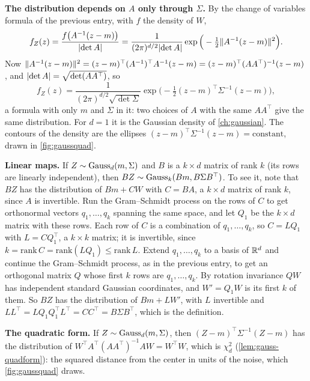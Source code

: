 \textbf{The distribution depends on $A$ only through $\Sigma$.}
By the change of variables formula of the previous entry, with $f$ the density of $W$,
\[
f_Z(z) = \frac{f\big(A^{-1}(z - m)\big)}{\lvert\det A\rvert} = \frac{1}{(2\pi)^{d/2}\lvert\det A\rvert}\exp\Big(-\tfrac12\lVert A^{-1}(z - m)\rVert^2\Big).
\]
Now $\lVert A^{-1}(z - m)\rVert^2 = (z - m)^\top(A^{-1})^\top A^{-1}(z - m) = (z - m)^\top(AA^\top)^{-1}(z - m)$, and $\lvert\det A\rvert = \sqrt{\det(AA^\top)}$, so
\[
f_Z(z) = \frac{1}{(2\pi)^{d/2}\sqrt{\det\Sigma}}\exp\Big(-\tfrac12(z - m)^\top\Sigma^{-1}(z - m)\Big),
\]
a formula with only $m$ and $\Sigma$ in it: two choices of $A$ with the same $AA^\top$ give the same distribution.
For $d = 1$ it is the Gaussian density of \cref{ch:gaussian}.
The contours of the density are the ellipses $(z - m)^\top\Sigma^{-1}(z - m) = \text{constant}$, drawn in \cref{fig:gaussquad}.

\textbf{Linear maps.}
If $Z \sim \text{Gauss}_d(m, \Sigma)$ and $B$ is a $k \times d$ matrix of rank $k$ (its rows are linearly independent), then $BZ \sim \text{Gauss}_k(Bm, B\Sigma B^\top)$.
To see it, note that $BZ$ has the distribution of $Bm + CW$ with $C = BA$, a $k \times d$ matrix of rank $k$, since $A$ is invertible.
Run the Gram--Schmidt process on the rows of $C$ to get orthonormal vectors $q_1, \ldots, q_k$ spanning the same space, and let $Q_1$ be the $k \times d$ matrix with these rows.
Each row of $C$ is a combination of $q_1, \ldots, q_k$, so $C = LQ_1$ with $L = CQ_1^\top$, a $k \times k$ matrix; it is invertible, since $k = \mathrm{rank}\,C = \mathrm{rank}(LQ_1) \leq \mathrm{rank}\,L$.
Extend $q_1, \ldots, q_k$ to a basis of $\mathbb{R}^d$ and continue the Gram--Schmidt process, as in the previous entry, to get an orthogonal matrix $Q$ whose first $k$ rows are $q_1, \ldots, q_k$.
By rotation invariance $QW$ has independent standard Gaussian coordinates, and $W' = Q_1W$ is its first $k$ of them.
So $BZ$ has the distribution of $Bm + LW'$, with $L$ invertible and $LL^\top = LQ_1Q_1^\top L^\top = CC^\top = B\Sigma B^\top$, which is the definition.

\textbf{The quadratic form.}
If $Z \sim \text{Gauss}_d(m, \Sigma)$, then $(Z - m)^\top\Sigma^{-1}(Z - m)$ has the distribution of $W^\top A^\top(AA^\top)^{-1}AW = W^\top W$, which is $\chi^2_d$ (\cref{lem:gauss-quadform}): the squared distance from the center in units of the noise, which \cref{fig:gaussquad} draws.

